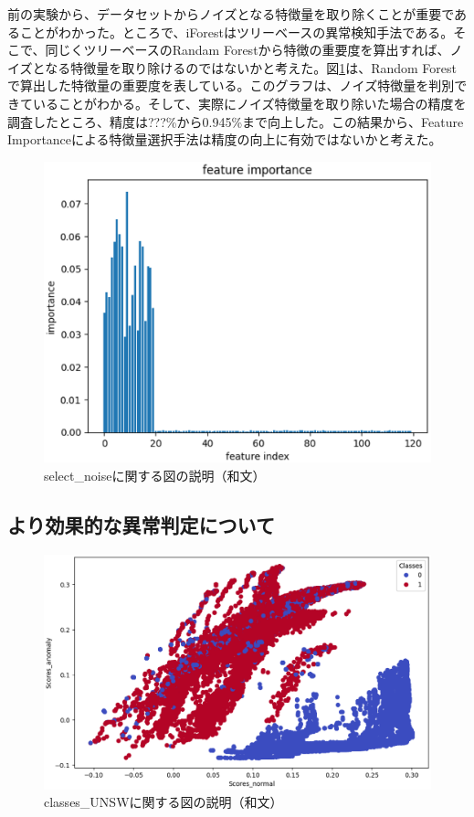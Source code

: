 \documentclass{css}
\begin{document}
前の実験から、データセットからノイズとなる特徴量を取り除くことが重要であることがわかった。ところで、iForestはツリーベースの異常検知手法である。そこで、同じくツリーベースのRandam Forestから特徴の重要度を算出すれば、ノイズとなる特徴量を取り除けるのではないかと考えた。図\ref{fig:select_noise}は、Random Forestで算出した特徴量の重要度を表している。このグラフは、ノイズ特徴量を判別できていることがわかる。そして、実際にノイズ特徴量を取り除いた場合の精度を調査したところ、精度は???\%から0.945\%まで向上した。この結果から、Feature Importanceによる特徴量選択手法は精度の向上に有効ではないかと考えた。

\begin{figure}[tb]
    \centering
    \includegraphics[width=\linewidth]{pictures/eps/select_noise.eps}
    \caption{select\_noiseに関する図の説明（和文）}
    \label{fig:select_noise}
\end{figure}

\subsection{より効果的な異常判定について}


\begin{figure}[tb]
    \centering
    \includegraphics[width=\linewidth]{pictures/eps/classes_UNSW.eps}
    \caption{classes\_UNSWに関する図の説明（和文）}
    \label{fig:classes_UNSW}
\end{figure}
\end{document}
